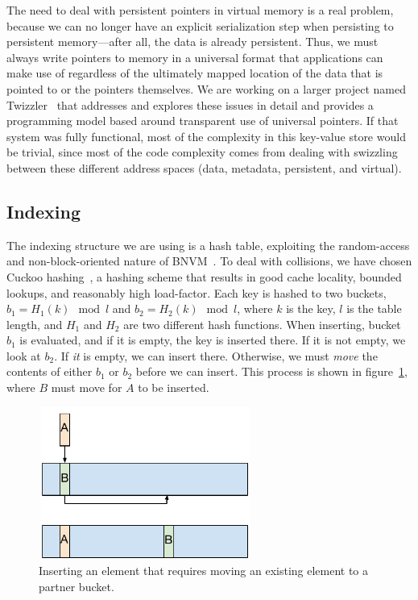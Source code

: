 The need to deal with persistent pointers in virtual memory is a real problem,
because we can no longer have an explicit serialization step when persisting to
persistent memory---after all, the data is already persistent. Thus, we must
always write pointers to memory in a universal format that applications can make
use of regardless of the ultimately mapped location of the data that is pointed
to or the pointers themselves. We are working on a larger project named
Twizzler~\cite{bittman-ssrctr-17-01} that addresses and explores these issues in
detail and provides a programming model based around transparent use of
universal pointers. If that system was fully functional, most of the complexity in this
key-value store would be trivial, since most of the code complexity comes from
dealing with swizzling between these different address spaces (data, metadata,
persistent, and virtual).


\subsection{Indexing}

The indexing structure we are using is a hash table, exploiting the
random-access and non-block-oriented nature of BNVM~\cite{Debnath:2016ht}. To
deal with collisions, we have chosen Cuckoo hashing~\cite{Pagh:2004}, a hashing
scheme that results in good cache locality, bounded lookups, and reasonably high
load-factor. Each key is hashed to two buckets, $b_1 = H_1(k) \mod l$ and $b_2 =
H_2(k) \mod l$, where $k$ is the key, $l$ is the table length, and $H_1$ and
$H_2$ are two different hash functions. When inserting, bucket $b_1$ is
evaluated, and if it is empty, the key is inserted there. If it is not empty, we
look at $b_2$. If \textit{it} is empty, we can insert there. Otherwise, we must
\textit{move} the contents of either $b_1$ or $b_2$ before we can insert. This
process is shown in figure~\ref{fig:insert}, where $B$ must move for $A$ to be
inserted.

\begin{figure}
\centering
\includegraphics[width=70mm,height=50mm]{fig/cuckoo_insert}
\caption{Inserting an element that requires moving an existing element to a
partner bucket.}
\label{fig:insert}
\end{figure}


